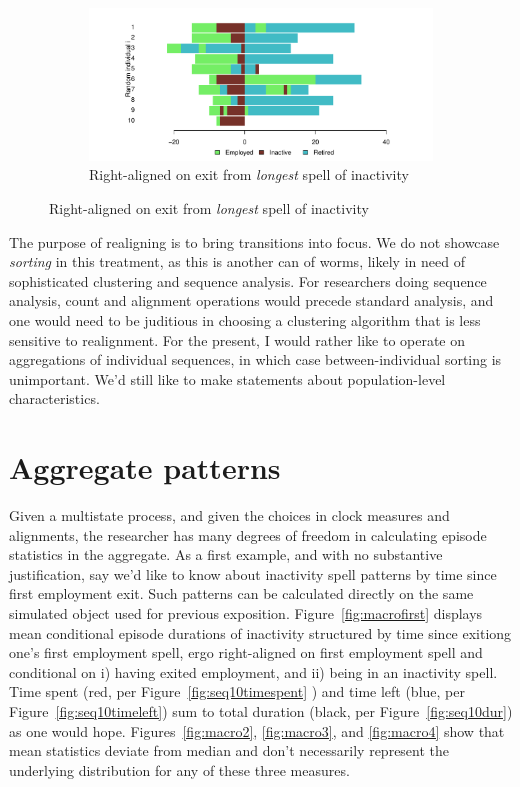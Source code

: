\documentclass{article}
\begin{document}
\begin{figure}[ht!]
\begin{subfigure}{\textwidth}
\centering
\caption{Right-aligned on exit from \emph{longest} spell of inactivity}
\label{fig:longinactright}
\includegraphics[scale=.5]{Figures/Seq10inactlongright.pdf}
\end{subfigure}

\end{figure}

The purpose of realigning is to bring transitions into focus. We do not showcase
\emph{sorting} in this treatment, as this is another can of worms, likely in
need of sophisticated clustering and sequence analysis. For researchers doing
sequence analysis, count and alignment operations would precede standard
analysis, and one would need to be juditious in choosing a clustering algorithm
that is less sensitive to realignment. For the present, I would rather
like to operate on aggregations of individual sequences, in which case between-individual sorting is unimportant. We'd still like to make statements about population-level characteristics.

\FloatBarrier
\section{Aggregate patterns}
Given a multistate process, and given the choices in clock measures and
alignments, the researcher has many degrees of freedom in calculating episode
statistics in the aggregate. As a first example, and with no substantive
justification, say we'd like to know about inactivity spell patterns by time
since first employment exit. Such patterns can be calculated directly on the
same simulated object used for previous exposition.
Figure~\ref{fig:macrofirst} displays mean conditional episode durations of
inactivity structured by time since exitiong one's first employment spell, ergo
right-aligned on first employment spell and conditional on i) having exited
employment, and ii) being in an inactivity spell. Time spent (red, per
Figure~\ref{fig:seq10timespent} ) and time left (blue, per
Figure~\ref{fig:seq10timeleft}) sum to total duration
(black, per
Figure~\ref{fig:seq10dur}) as one would hope.
Figures~\ref{fig:macro2}, \ref{fig:macro3}, and \ref{fig:macro4} show that mean
statistics deviate from median and don't necessarily represent the underlying
distribution for any of these three measures. 
\end{document}
